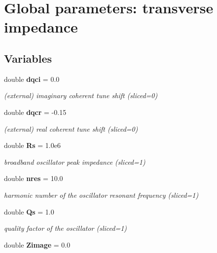\section{Global parameters: transverse impedance}
\label{group__Impedance}
\subsection*{Variables}
\begin{CompactItemize}
\item 
double {\bf dqci} = 0.0\label{group__Impedance_a0}

\begin{CompactList}\small\item\em (external) imaginary coherent tune shift (sliced=0)\item\end{CompactList}\item 
double {\bf dqcr} = -0.15\label{group__Impedance_a1}

\begin{CompactList}\small\item\em (external) real coherent tune shift (sliced=0)\item\end{CompactList}\item 
double {\bf Rs} = 1.0e6\label{group__Impedance_a2}

\begin{CompactList}\small\item\em broadband oscillator peak impedance (sliced=1)\item\end{CompactList}\item 
double {\bf nres} = 10.0\label{group__Impedance_a3}

\begin{CompactList}\small\item\em harmonic number of the oscillator resonant frequency (sliced=1)\item\end{CompactList}\item 
double {\bf Qs} = 1.0\label{group__Impedance_a4}

\begin{CompactList}\small\item\em quality factor of the oscillator (sliced=1)\item\end{CompactList}\item 
double {\bf Zimage} = 0.0\label{group__Impedance_a5}


\end{CompactItemize}
